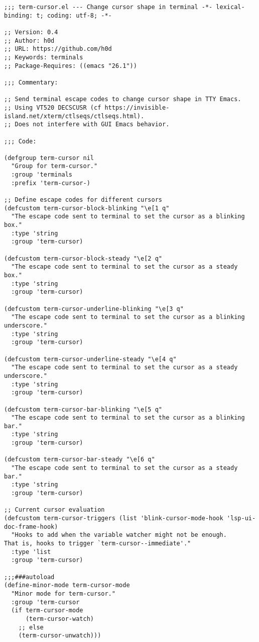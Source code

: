 \documentclass[8pt]{article}
\begin{document}
\begin{verbatim}
;;; term-cursor.el --- Change cursor shape in terminal -*- lexical-binding: t; coding: utf-8; -*-

;; Version: 0.4
;; Author: h0d
;; URL: https://github.com/h0d
;; Keywords: terminals
;; Package-Requires: ((emacs "26.1"))

;;; Commentary:

;; Send terminal escape codes to change cursor shape in TTY Emacs.
;; Using VT520 DECSCUSR (cf https://invisible-island.net/xterm/ctlseqs/ctlseqs.html).
;; Does not interfere with GUI Emacs behavior.

;;; Code:

(defgroup term-cursor nil
  "Group for term-cursor."
  :group 'terminals
  :prefix 'term-cursor-)

;; Define escape codes for different cursors
(defcustom term-cursor-block-blinking "\e[1 q"
  "The escape code sent to terminal to set the cursor as a blinking box."
  :type 'string
  :group 'term-cursor)

(defcustom term-cursor-block-steady "\e[2 q"
  "The escape code sent to terminal to set the cursor as a steady box."
  :type 'string
  :group 'term-cursor)

(defcustom term-cursor-underline-blinking "\e[3 q"
  "The escape code sent to terminal to set the cursor as a blinking underscore."
  :type 'string
  :group 'term-cursor)

(defcustom term-cursor-underline-steady "\e[4 q"
  "The escape code sent to terminal to set the cursor as a steady underscore."
  :type 'string
  :group 'term-cursor)

(defcustom term-cursor-bar-blinking "\e[5 q"
  "The escape code sent to terminal to set the cursor as a blinking bar."
  :type 'string
  :group 'term-cursor)

(defcustom term-cursor-bar-steady "\e[6 q"
  "The escape code sent to terminal to set the cursor as a steady bar."
  :type 'string
  :group 'term-cursor)

;; Current cursor evaluation
(defcustom term-cursor-triggers (list 'blink-cursor-mode-hook 'lsp-ui-doc-frame-hook)
  "Hooks to add when the variable watcher might not be enough.
That is, hooks to trigger `term-cursor--immediate'."
  :type 'list
  :group 'term-cursor)

;;;###autoload
(define-minor-mode term-cursor-mode
  "Minor mode for term-cursor."
  :group 'term-cursor
  (if term-cursor-mode
      (term-cursor-watch)
    ;; else
    (term-cursor-unwatch)))


\end{verbatim}
\end{document}
